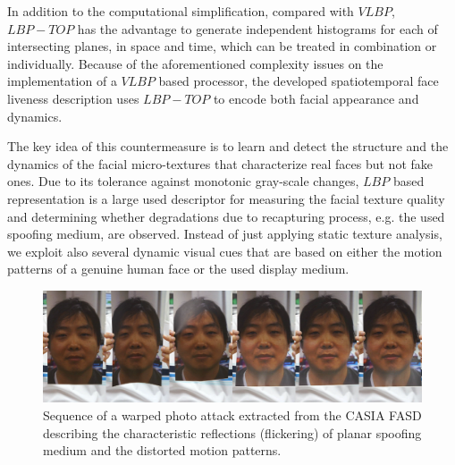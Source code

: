 In addition to the computational simplification, compared with $VLBP$, $LBP-TOP$ has the advantage to generate independent histograms for each of intersecting planes, in space and time, which can be treated in combination or individually. Because of the aforementioned complexity issues on the implementation of a $VLBP$ based processor, the developed spatiotemporal face liveness description uses $LBP-TOP$ to encode both facial appearance and dynamics. 

The key idea of this countermeasure is to learn and detect the structure and the dynamics of the facial micro-textures that characterize real faces but not fake ones. Due to its tolerance against monotonic gray-scale changes, $LBP$ based representation is a large used descriptor for measuring the facial texture quality and determining whether degradations due to recapturing process, e.g. the used spoofing medium, are observed. Instead of just applying static texture analysis, we exploit also several dynamic visual cues that are based on either the motion patterns of a genuine human face or the used display medium.

\begin{figure}[!htb]
\begin{center}
\includegraphics [width=0.85\linewidth] {images/proposed_countermeasure/flicker.png}
\caption[Sequence of a warped photo attack extracted from the CASIA FASD]{Sequence of a warped photo attack extracted from the CASIA FASD \cite{zhangface} describing the characteristic reflections (flickering) of planar spoofing medium and the distorted motion patterns.} \label{fig:flickering}
\end{center}
\end{figure}

